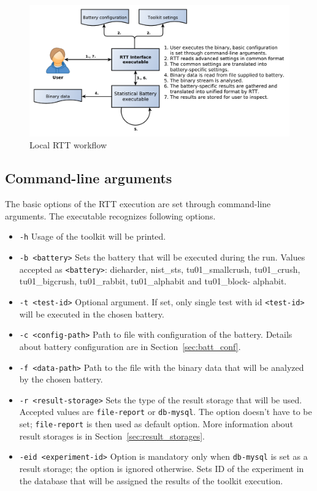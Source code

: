 \documentclass[
  digital,  	%
  color,		%
  oneside,   	%
  12pt,
  nocover,
  notable,
  nolof,
  nolot,
]{fithesis3}
\theoremstyle{definition}
\theoremstyle{remark}
\begin{document}
\begin{figure}[h!]
\begin{nomar}
\centering
\includegraphics[width=\paperwidth-4cm]{figures/local-rtt-workflow.pdf}
\end{nomar}
\caption{Local RTT workflow}
\label{fig:rtt_local_workflow}
\end{figure}

\subsection{Command-line arguments}
The basic options of the RTT execution are set through command-line arguments. The executable recognizes following options.

\begin{itemize}
\item \texttt{-h} Usage of the toolkit will be printed.
\item \texttt{-b <battery>} Sets the battery that will be executed during the run. Values accepted as \texttt{<battery>}: dieharder, nist\_sts, tu01\_smallcrush, tu01\_crush, tu01\_bigcrush, tu01\_rabbit, tu01\_alphabit and tu01\_block- \linebreak alphabit.
\item \texttt{-t <test-id>} Optional argument. If set, only single test with id \texttt{<test-id>} will be executed in the chosen battery.
\item \texttt{-c <config-path>} Path to file with configuration of the battery. Details about battery configuration are in Section~\ref{sec:batt_conf}.
\item \texttt{-f <data-path>} Path to the file with the binary data that will be analyzed by the chosen battery.
\item \texttt{-r <result-storage>} Sets the type of the result storage that will be used. Accepted values are \texttt{file-report} or \texttt{db-mysql}. The option doesn't have to be set; \texttt{file-report} is then used as default option. More information about result storages is in Section~\ref{sec:result_storages}.
\item \texttt{-eid <experiment-id>} Option is mandatory only when \texttt{db-mysql} is set as a result storage; the option is ignored otherwise. Sets ID of the experiment in the database that will be assigned the results of the toolkit execution.
\end{itemize}
\end{document}
